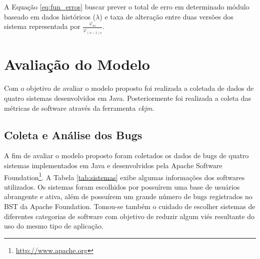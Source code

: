 \documentclass[12pt]{article}
\begin{document}
A Equação \ref{eq:fun_erros} buscar prever o total de erro em determinado módulo
baseado em dados históricos ($\lambda$) e taxa de alteração entre duas versões
dos sistema representada por  $\frac{\varphi_{vc}}{\varphi_{(v-1)c}}{}$.

\section{Avaliação do Modelo}
\label{sec:avaliacao}
Com o objetivo de avaliar o modelo proposto foi realizada a coletada de dados de
quatro sistemas desenvolvidos em Java. Posteriormente foi realizada a coleta das
métricas de software através da ferramenta \textit{ckjm}\cite{Jur10}.
\subsection{Coleta e Análise dos Bugs}
\label{subsec:analise_coleta_bugs}

A fim de avaliar o modelo proposto foram coletados os dados de bugs de quatro sistemas implementados em Java e desenvolvidos pela Apache Software Foundation\footnote{\url{http://www.apache.org}}. A Tabela \ref{tab:sistemas} exibe algumas informações dos softwares utilizados. Os sistemas foram escolhidos por possuírem uma base de usuários abrangente e ativa, além de possuírem um grande número de bugs registrados no BST da Apache Foundation. Tomou-se também o cuidado de escolher sistemas de diferentes categorias de software com objetivo de reduzir algum viés resultante do uso do mesmo tipo de aplicação.

\begin{table}[h]
\caption{Sistemas utilizados na avaliação}
\label{tab:sistemas}
\end{table}
\end{document}
